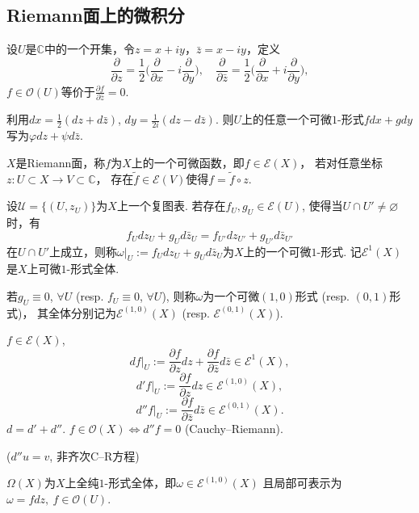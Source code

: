 \subsection{Riemann面上的微积分}
\begin{definition}
	设$U$是$\mathbb{C}$中的一个开集，令$z=x+iy$，$\bar{z}=x-iy$，定义
	\[\frac{\partial}{\partial z}
    =\frac{1}{2}\bigg(\frac{\partial}{\partial x}-i\frac{\partial}{\partial y}\bigg),
	\quad\frac{\partial}{\partial \bar{z}}
    =\frac{1}{2}\bigg(\frac{\partial}{\partial x}+i\frac{\partial}{\partial y}\bigg),\] 
    $f\in \mathcal{O}(U)$等价于$\frac{\partial f}{\partial \bar{z}}=0$.
		
	利用$dx=\frac{1}{2}(dz+d\bar{z})$, $dy=\frac{1}{2i}(dz-d\bar{z})$. 
    则$U$上的任意一个可微$1$-形式$fdx+gdy$写为$\varphi dz+\psi d\bar{z}$.

	$X$是Riemann面，称$f$为$X$上的一个可微函数，即$f\in \mathcal{E}(X)$，
    若对任意坐标$z\colon U\subset X\rightarrow V\subset \mathbb{C}$，
    存在$\tilde{f}\in \mathcal{E}(V)$使得$f=\tilde{f}\circ z$.
\end{definition}
		
		
\begin{definition}
	设$\mathscr{U}=\{(U,z_U)\}$为$X$上一个复图表. 
    若存在$f_U, g_U\in \mathcal{E}(U)$, 使得当$U\cap U'\neq \varnothing$时，有
	$$f_Udz_U+g_Ud\bar{z}_U=f_{U'}dz_{U'}+g_{U'}d\bar{z}_{U'}$$
	在$U\cap U'$上成立，则称$\omega|_U:=f_Udz_U+g_Ud\bar{z}_U$为$X$上的一个可微$1$-形式. 
    记$\mathcal{E}^1(X)$是$X$上可微$1$-形式全体.
	
	若$g_U\equiv 0$, $\forall U$ (resp. $f_U\equiv 0$, $\forall U$), 
    则称$\omega$为一个可微$(1,0)$形式 (resp. $(0,1)$形式)，
    其全体分别记为$\mathcal{E}^{(1,0)}(X)$ (resp. $\mathcal{E}^{(0,1)}(X)$).
\end{definition}
		
		
\begin{example} $f\in \mathcal{E}(X)$,
	$$df|_U:=\frac{\partial f}{\partial z} dz+\frac{\partial f}{\partial \bar{z}} d\bar{z}\in \mathcal{E}^1(X),$$
	$$d'f|_U:=	\frac{\partial f}{\partial z} dz\in \mathcal{E}^{(1,0)}(X),$$
	$$d''f|_U:=\frac{\partial f}{\partial \bar{z}} d\bar{z}\in  \mathcal{E}^{(0,1)}(X).$$ 
	$d=d'+d''$. $f\in \mathcal{O}(X) \iff d''f=0$ (Cauchy--Riemann).

	($d''u=v$, 非齐次C--R方程)
\end{example}

\begin{definition}
	$\Omega(X)$为$X$上全纯$1$-形式全体，即$\omega\in \mathcal{E}^{(1,0)}(X)$
    且局部可表示为$\omega=fdz,\ f\in \mathcal{O}(U)$.
\end{definition}
		
